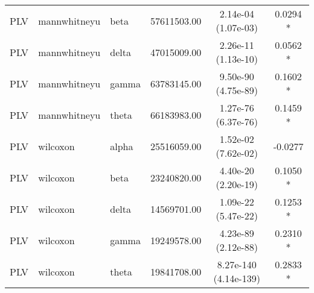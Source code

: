 \begin{tabular}{l l l c c c}
    PLV & mannwhitneyu & beta & 57611503.00 & 2.14e-04 (1.07e-03) & 0.0294 * \\
    PLV & mannwhitneyu & delta & 47015009.00 & 2.26e-11 (1.13e-10) & 0.0562 * \\
    PLV & mannwhitneyu & gamma & 63783145.00 & 9.50e-90 (4.75e-89) & 0.1602 * \\
    PLV & mannwhitneyu & theta & 66183983.00 & 1.27e-76 (6.37e-76) & 0.1459 * \\
    PLV & wilcoxon & alpha & 25516059.00 & 1.52e-02 (7.62e-02) & -0.0277  \\
    PLV & wilcoxon & beta & 23240820.00 & 4.40e-20 (2.20e-19) & 0.1050 * \\
    PLV & wilcoxon & delta & 14569701.00 & 1.09e-22 (5.47e-22) & 0.1253 * \\
    PLV & wilcoxon & gamma & 19249578.00 & 4.23e-89 (2.12e-88) & 0.2310 * \\
    PLV & wilcoxon & theta & 19841708.00 & 8.27e-140 (4.14e-139) & 0.2833 * \\
    \bottomrule
\end{tabular}